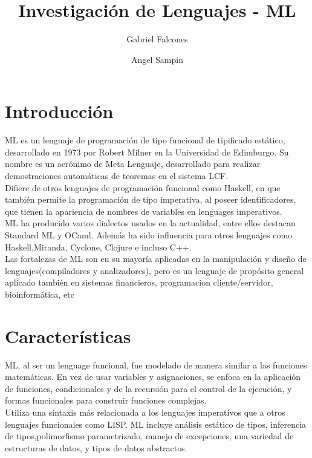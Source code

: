 \documentclass[11pt]{article} %
\title{\color{red}Investigación de Lenguajes - ML}
\author{Gabriel Falcones\and Angel Sampin}
\begin{document}
\maketitle


\section{\color{red}Introducción}
ML es un lenguaje de programación de tipo funcional de tipificado estático, desarrollado en 1973 por Robert Milner en la Universidad de Edimburgo. Su nombre es un acrónimo de Meta Lenguaje, desarrollado para realizar demostraciones automáticas de teoremas en el sistema LCF.\\

Difiere de otros lenguajes de programación funcional como Haskell, en que también permite la programación de tipo imperativa, al poseer identificadores, que tienen la apariencia de nombres de variables en lenguages imperativos.\\

ML ha producido varios dialectos usados en la actualidad, entre ellos destacan Standard ML y OCaml. Además ha sido influencia para otros lenguajes como Haskell,Miranda, Cyclone, Clojure e incluso C++.\\

Las fortalezas de ML son en su mayoría aplicadas en la manipulación y diseño de lenguajes(compiladores y analizadores), pero es un lenguaje de propósito general aplicado también en sistemas financieros, programacion cliente/servidor, bioinformática, etc
  

\section{\color{red}Características}
ML, al ser un lenguage funcional, fue modelado de manera similar a las funciones matemáticas. En vez de usar variables y asignaciones, se enfoca en la aplicación de funciones, condicionales y de la recursión para el control de la ejecución, y formas funcionales para construir funciones complejas.\\
 
Utiliza una sintaxis más relacionada a los lenguajes imperativos que a otros lenguajes funcionales como LISP.
ML incluye análisis estático de tipos, inferencia de tipos,polimorfismo parametrizado, manejo de excepciones, una variedad de estructuras de datos, y tipos de datos abstractos.\\
\end{document}
